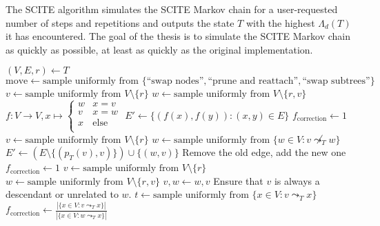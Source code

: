 The \ac{SCITE} algorithm simulates the \ac{SCITE} Markov chain for a user-requested number of steps and repetitions and outputs the state $T$ with the highest $\Lambda_d(T)$ it has encountered. The goal of the thesis is to simulate the \ac{SCITE} Markov chain as quickly as possible, at least as quickly as the original implementation.

\begin{algorithm}[p]
    \begin{algorithmic}[1]
            \State $(V, E, r) \leftarrow T$
            \State $\mathrm{move} \leftarrow \text{sample uniformly from } \{\text{``swap nodes''}, \text{``prune and reattach''}, \text{``swap subtrees''}\}$
                \State $v \leftarrow \text{sample uniformly from } V \setminus \{r\}$
                \State $w \leftarrow \text{sample uniformly from } V \setminus \{r, v\}$
                \State $f : V \rightarrow V, x \mapsto \begin{cases}
                    w & x = v \\
                    v & x = w \\
                    x & \text{else} \\
                \end{cases}$
                \State $E' \leftarrow \{(f(x), f(y)) : (x, y) \in E\}$
                \State $f_\mathrm{correction} \leftarrow 1$
                \State $v \leftarrow \text{sample uniformly from } V \setminus \{r\}$
                \State $w \leftarrow \text{sample uniformly from } \{w \in V : v \not\leadsto_T w\}$
                \State $E' \leftarrow \left(E \setminus \{(p_T(v), v)\}\right)  \cup \{(w, v)\}$ \Comment Remove the old edge, add the new one
                \State $f_\mathrm{correction} \leftarrow 1$
                \State $v \leftarrow \text{sample uniformly from } V \setminus \{r\}$
                \State $w \leftarrow \text{sample uniformly from } V \setminus \{r, v\}$
                    \State $v, w \leftarrow w, v$ \Comment Ensure that $v$ is always a descendant or unrelated to $w$.
                \EndIf
                    \State $t \leftarrow \text{sample uniformly from } \{x \in V: v \leadsto_T x\}$
                    \State $f_\mathrm{correction} \leftarrow \frac{|\{x \in V : v \leadsto_T x\}|}{|\{x \in V : w \leadsto_T x\}|}$

\end{algorithmic}
\end{algorithm}
